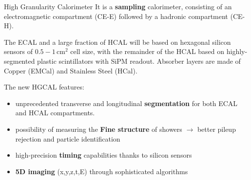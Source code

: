 \documentclass[10pt]{beamer}
\begin{document}
\begin{frame}{High Granularity Calorimeter}
    It is a \textbf{sampling} calorimeter, consisting of an electromagnetic compartment (CE-E) followed by a hadronic compartment (CE-H).
    
    The ECAL and a large fraction of HCAL will be based on hexagonal silicon sensors of $0.5 - 1\,\text{cm}^2$ cell size, with the remainder of the HCAL based on highly-segmented plastic scintillators with SiPM readout.
    Absorber layers are made of Copper (EMCal) and Stainless Steel (HCal).

    The new HGCAL features:
    \begin{itemize}
        \item unprecedented transverse and longitudinal \textbf{segmentation} for both ECAL and HCAL compartments. 
        \item possibility of measuring the \textbf{Fine structure} of showers $\rightarrow$ better pileup rejection and particle identification
        \item high-precision \textbf{timing} capabilities thanks to silicon sensors
        \item \textbf{5D imaging} (x,y,z,t,E) through sophisticated algorithms 
    \end{itemize}{}
\end{frame}

%        


 
\end{document}
